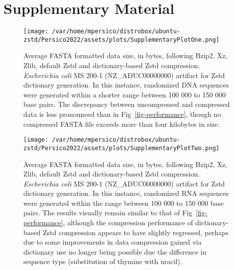\documentclass[
  10pt,
  letterpaper,
]{article}
\begin{document}
\newpage

\hypertarget{supplementary-material}{%
\section{Supplementary Material}\label{supplementary-material}}

\begin{figure}

{\centering \texttt{[image: /var/home/mpersico/distrobox/ubuntu-zstd/Persico2022/assets/plots/SupplementaryPlotOne.png]}

}

\caption{\label{fig-rna}Average FASTA formatted data size, in bytes,
following Bzip2, Xz, Zlib, default Zstd and dictionary-based Zstd
compression. \emph{Escherichia coli} MS 200-1 (NZ\_ADUC00000000)
artifact for Zstd dictionary generation. In this instance, randomized
DNA sequences were generated within a shorter range between 100 000 to
150 000 base pairs. The discrepancy between uncompressed and compressed
data is less pronounced than in Fig~\ref{fig-performance}, though no
compressed FASTA file exceeds more than four kilobytes in size.}

\end{figure}

\begin{figure}

{\centering \texttt{[image: /var/home/mpersico/distrobox/ubuntu-zstd/Persico2022/assets/plots/SupplementaryPlotTwo.png]}

}

\caption{\label{fig-rna}Average FASTA formatted data size, in bytes,
following Bzip2, Xz, Zlib, default Zstd and dictionary-based Zstd
compression. \emph{Escherichia coli} MS 200-1 (NZ\_ADUC00000000)
artifact for Zstd dictionary generation. In this instance, randomized
RNA sequences were generated within the range between 100 000 to 150 000
base pairs. The results visually remain similar to that of
Fig~\ref{fig-performance}, although the compression performance of
dictionary-based Zstd compression appears to have slightly regressed,
perhaps due to some improvements in data compression gained via
dictionary use no longer being possible due the difference in sequence
type (substitution of thymine with uracil).}

\end{figure}
\end{document}
